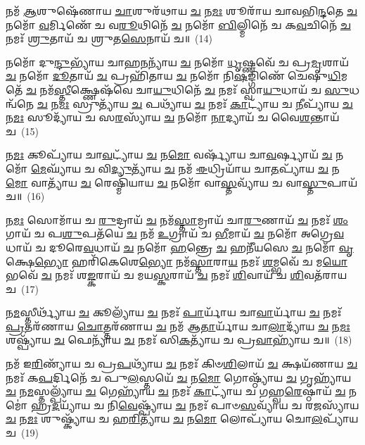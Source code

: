 𑌨𑌮᳴ \ul{𑌆}\-𑌶𑍁𑌷𑍇᳴𑌣𑌾𑌯 \ul{𑌚𑌾}\-𑌶𑍁𑌰᳴𑌥𑌾𑌯 \ul{𑌚} 𑌨\-\ul{𑌮𑌃} 𑌶𑍂𑌰𑌾᳴𑌯 𑌚𑌾𑌵𑌭𑌿\-\ul{𑌨𑍍𑌦}\-𑌤𑍇 \ul{𑌚} 𑌨𑌮𑍋᳴ \ul{𑌵}\-𑌰𑍍𑌮𑌿𑌣𑍇᳴ 𑌚 𑌵\-\ul{𑌰𑍂}\-𑌥𑌿𑌨𑍇᳴ \ul{𑌚} 𑌨𑌮𑍋᳴ \ul{𑌬𑌿}\-𑌲𑍍𑌮𑌿𑌨𑍇᳴ 𑌚 𑌕\-\ul{𑌵}\-𑌚𑌿𑌨𑍇᳴ \ul{𑌚} 𑌨𑌮𑌃᳴ \ul{𑌶𑍍𑌰𑍁}\-𑌤𑌾𑌯᳴ 𑌚 𑌶𑍍𑌰𑍁𑌤\-\ul{𑌸𑍇}\-𑌨𑌾𑌯᳴ 𑌚॥~(14)

{\anuvakamend[{\-\ul{𑌪𑍍𑌰}\-\-\ul{𑌤𑌿}\-\-\ul{𑌶𑍍𑌰}\-𑌵𑌾𑌯᳴ \ul{𑌚} 𑌪𑌞𑍍𑌚᳴𑌵𑌿𑍞𑌶𑌤𑌿𑌶𑍍𑌚}]}%

𑌨𑌮𑍋᳴ 𑌦𑍁\-\ul{𑌨𑍍𑌦𑍁}\-𑌭𑍍𑌯𑌾᳴𑌯 𑌚𑌾𑌹\-\ul{𑌨}\-𑌨𑍍𑌯𑌾᳴𑌯 \ul{𑌚} 𑌨𑌮𑍋᳴ \ul{𑌧𑍃}\-𑌷𑍍𑌣𑌵𑍇᳴ 𑌚 𑌪𑍍𑌰\-\ul{𑌮𑍃}\-𑌶𑌾𑌯᳴ \ul{𑌚} 𑌨𑌮𑍋᳴ \ul{𑌦𑍂}\-𑌤𑌾𑌯᳴ \ul{𑌚} 𑌪𑍍𑌰𑌹𑌿᳴𑌤𑌾𑌯 \ul{𑌚} 𑌨𑌮𑍋᳴ 𑌨𑌿\-\ul{𑌷}\-𑌙𑍍𑌗𑌿𑌣𑍇᳴ 𑌚𑍇𑌷𑍁\-\ul{𑌧𑌿}\-𑌮𑌤𑍇᳴ \ul{𑌚} 𑌨𑌮᳴\-\ul{𑌸𑍍𑌤𑍀}\-𑌕𑍍𑌷𑍍𑌣𑍇𑌷᳴𑌵𑍇 𑌚𑌾\-\ul{𑌯𑍁}\-𑌧𑌿𑌨𑍇᳴ \ul{𑌚} 𑌨𑌮𑌃᳴ 𑌸𑍍𑌵𑌾\-\ul{𑌯𑍁}\-𑌧𑌾𑌯᳴ 𑌚 \ul{𑌸𑍁}\-𑌧𑌨𑍍𑌵᳴𑌨𑍇 \ul{𑌚} 𑌨\-\ul{𑌮𑌃} 𑌸𑍍𑌰𑍁𑌤𑍍𑌯𑌾᳴𑌯 \ul{𑌚} 𑌪𑌥𑍍𑌯𑌾᳴𑌯 \ul{𑌚} 𑌨𑌮𑌃᳴ \ul{𑌕𑌾}\-𑌟𑍍𑌯𑌾᳴𑌯 𑌚 \ul{𑌨𑍀}\-𑌪𑍍𑌯𑌾᳴𑌯 \ul{𑌚} 𑌨\-\ul{𑌮𑌃} 𑌸𑍂𑌦𑍍𑌯𑌾᳴𑌯 𑌚 𑌸\-\ul{𑌰}\-𑌸𑍍𑌯𑌾᳴𑌯 \ul{𑌚} 𑌨𑌮𑍋᳴ \ul{𑌨𑌾}\-𑌦𑍍𑌯𑌾𑌯᳴ 𑌚 𑌵𑍈\-\ul{𑌶}\-𑌨𑍍𑌤𑌾𑌯᳴ 𑌚~(15)

𑌨\-\ul{𑌮𑌃} 𑌕𑍂𑌪𑍍𑌯𑌾᳴𑌯 𑌚𑌾\-\ul{𑌵}\-𑌟𑍍𑌯𑌾᳴𑌯 \ul{𑌚} 𑌨\-\ul{𑌮𑍋} 𑌵𑌰𑍍𑌷𑍍𑌯𑌾᳴𑌯 𑌚𑌾\-\ul{𑌵}\-𑌰𑍍𑌷𑍍𑌯𑌾𑌯᳴ \ul{𑌚} 𑌨𑌮𑍋᳴ \ul{𑌮𑍇}\-𑌘𑍍𑌯𑌾᳴𑌯 𑌚 𑌵𑌿\-\ul{𑌦𑍍𑌯𑍁}\-𑌤𑍍𑌯𑌾᳴𑌯 \ul{𑌚} 𑌨𑌮᳴ \ul{𑌈}\-𑌧𑍍𑌰𑌿𑌯𑌾᳴𑌯 𑌚𑌾\-\ul{𑌤}\-𑌪𑍍𑌯𑌾᳴𑌯 \ul{𑌚} 𑌨\-\ul{𑌮𑍋} 𑌵𑌾𑌤𑍍𑌯𑌾᳴𑌯 \ul{𑌚} 𑌰𑍇𑌷𑍍𑌮𑌿᳴𑌯𑌾𑌯 \ul{𑌚} 𑌨𑌮𑍋᳴ 𑌵𑌾\-\ul{𑌸𑍍𑌤}\-𑌵𑍍𑌯𑌾᳴𑌯 𑌚 𑌵𑌾\-\ul{𑌸𑍍𑌤𑍁}\-𑌪𑌾𑌯᳴ 𑌚॥~(16)

{\anuvakamend[{\-\ul{𑌵𑍈}\-\-\ul{𑌶}\-𑌨𑍍𑌤𑌾𑌯᳴ 𑌚 \ul{𑌤𑍍𑌰𑌿}\-\-\ul{𑍞}\-𑌶𑌚𑍍𑌚᳴}]}%

𑌨\-\ul{𑌮𑌃} 𑌸𑍋𑌮𑌾᳴𑌯 𑌚 \ul{𑌰𑍁}\-𑌦𑍍𑌰𑌾𑌯᳴ \ul{𑌚} 𑌨𑌮᳴\-\ul{𑌸𑍍𑌤𑌾}\-𑌮𑍍𑌰𑌾𑌯᳴ 𑌚𑌾\-\ul{𑌰𑍁}\-𑌣𑌾𑌯᳴ \ul{𑌚} 𑌨𑌮𑌃᳴ \ul{𑌶𑌂}\-𑌗𑌾𑌯᳴ 𑌚 𑌪\-\ul{𑌶𑍁}\-𑌪𑌤᳴𑌯𑍇 \ul{𑌚} 𑌨𑌮᳴ \ul{𑌉}\-𑌗𑍍𑌰𑌾𑌯᳴ 𑌚 \ul{𑌭𑍀}\-𑌮𑌾𑌯᳴ \ul{𑌚} 𑌨𑌮𑍋᳴ 𑌅𑌗𑍍𑌰𑍇\-\ul{𑌵}\-𑌧𑌾𑌯᳴ 𑌚 𑌦𑍂𑌰𑍇\-\ul{𑌵}\-𑌧𑌾𑌯᳴ \ul{𑌚} 𑌨𑌮𑍋᳴ \ul{𑌹}\-𑌨𑍍𑌤𑍍𑌰𑍇 \ul{𑌚} 𑌹𑌨𑍀᳴𑌯𑌸𑍇 \ul{𑌚} 𑌨𑌮𑍋᳴ \ul{𑌵𑍃}\-𑌕𑍍𑌷𑍇\-\ul{𑌭𑍍𑌯𑍋} 𑌹𑌰𑌿᳴𑌕𑍇𑌶𑍇\-\ul{𑌭𑍍𑌯𑍋} 𑌨𑌮᳴\-\ul{𑌸𑍍𑌤𑌾}\-𑌰𑌾\-\ul{𑌯} 𑌨𑌮𑌃᳴ \ul{𑌶}\-𑌮𑍍𑌭𑌵𑍇᳴ 𑌚 𑌮\-\ul{𑌯𑍋}\-𑌭𑌵𑍇᳴ \ul{𑌚} 𑌨𑌮𑌃᳴ 𑌶\-\ul{𑌙𑍍𑌕}\-𑌰𑌾𑌯᳴ 𑌚 𑌮𑌯\-\ul{𑌸𑍍𑌕}\-𑌰𑌾𑌯᳴ \ul{𑌚} 𑌨𑌮𑌃᳴ \ul{𑌶𑌿}\-𑌵𑌾𑌯᳴ 𑌚 \ul{𑌶𑌿}\-𑌵𑌤᳴𑌰𑌾𑌯 𑌚~(17)

𑌨\-\ul{𑌮}\-𑌸𑍍𑌤𑍀𑌰𑍍𑌥𑍍𑌯𑌾᳴𑌯 \ul{𑌚} 𑌕𑍂𑌲𑍍𑌯𑌾᳴𑌯 \ul{𑌚} 𑌨𑌮𑌃᳴ \ul{𑌪𑌾}\-𑌰𑍍𑌯𑌾᳴𑌯 𑌚𑌾\-\ul{𑌵𑌾}\-𑌰𑍍𑌯𑌾᳴𑌯 \ul{𑌚} 𑌨𑌮𑌃᳴ \ul{𑌪𑍍𑌰}\-𑌤𑌰᳴𑌣𑌾𑌯 \ul{𑌚𑍋}\-𑌤𑍍𑌤𑌰᳴𑌣𑌾𑌯 \ul{𑌚} 𑌨𑌮᳴ 𑌆\-\ul{𑌤𑌾}\-𑌰𑍍𑌯𑌾᳴𑌯 𑌚𑌾\-\ul{𑌲𑌾}\-𑌦𑍍𑌯𑌾᳴𑌯 \ul{𑌚} 𑌨\-\ul{𑌮𑌃} 𑌶𑌷𑍍𑌪𑍍𑌯𑌾᳴𑌯 \ul{𑌚} 𑌫𑍇𑌨𑍍𑌯𑌾᳴𑌯 \ul{𑌚} 𑌨𑌮𑌃᳴ 𑌸𑌿\-\ul{𑌕}\-𑌤𑍍𑌯𑌾᳴𑌯 𑌚 𑌪𑍍𑌰\-\ul{𑌵𑌾}\-𑌹𑍍𑌯𑌾᳴𑌯 𑌚॥~(18)

{\anuvakamend[{\-\ul{𑌶𑌿}\-𑌵𑌤᳴𑌰𑌾𑌯 𑌚 \ul{𑌤𑍍𑌰𑌿}\-\-\ul{𑍞}\-𑌶𑌚𑍍𑌚᳴}]}%

𑌨𑌮᳴ 𑌇\-\ul{𑌰𑌿}\-𑌣𑍍𑌯𑌾᳴𑌯 𑌚 𑌪𑍍𑌰\-\ul{𑌪}\-𑌥𑍍𑌯𑌾᳴𑌯 \ul{𑌚} 𑌨𑌮𑌃᳴ 𑌕𑌿𑍞\-\ul{𑌶𑌿}\-𑌲𑌾𑌯᳴ \ul{𑌚} 𑌕𑍍𑌷𑌯᳴𑌣𑌾𑌯 \ul{𑌚} 𑌨𑌮𑌃᳴ 𑌕\-\ul{𑌪}\-𑌰𑍍𑌦𑌿𑌨𑍇᳴ 𑌚 𑌪𑍁\-\ul{𑌲}\-𑌸𑍍𑌤𑌯𑍇᳴ \ul{𑌚} 𑌨\-\ul{𑌮𑍋} 𑌗𑍋𑌷𑍍𑌠𑍍𑌯𑌾᳴𑌯 \ul{𑌚} 𑌗𑍃𑌹𑍍𑌯𑌾᳴𑌯 \ul{𑌚} 𑌨\-\ul{𑌮}\-𑌸𑍍𑌤𑌲𑍍𑌪𑍍𑌯𑌾᳴𑌯 \ul{𑌚} 𑌗𑍇𑌹𑍍𑌯𑌾᳴𑌯 \ul{𑌚} 𑌨𑌮𑌃᳴ \ul{𑌕𑌾}\-𑌟𑍍𑌯𑌾᳴𑌯 𑌚 𑌗𑌹𑍍𑌵\-\ul{𑌰𑍇}\-𑌷𑍍𑌠𑌾𑌯᳴ \ul{𑌚} 𑌨𑌮𑍋॑ 𑌹𑍍𑌰\-\ul{𑌦}\-𑌯𑍍𑌯𑌾᳴𑌯 𑌚 𑌨𑌿\-\ul{𑌵𑍇}\-𑌷𑍍𑌪𑍍𑌯𑌾᳴𑌯 \ul{𑌚} 𑌨𑌮𑌃᳴ 𑌪𑌾𑍞\-\ul{𑌸}\-𑌵𑍍𑌯𑌾᳴𑌯 𑌚 𑌰\-\ul{𑌜}\-𑌸𑍍𑌯𑌾᳴𑌯 \ul{𑌚} 𑌨\-\ul{𑌮𑌃} 𑌶𑍁𑌷𑍍𑌕𑍍𑌯𑌾᳴𑌯 𑌚 𑌹\-\ul{𑌰𑌿}\-𑌤𑍍𑌯𑌾᳴𑌯 \ul{𑌚} 𑌨\-\ul{𑌮𑍋} 𑌲𑍋𑌪𑍍𑌯𑌾᳴𑌯 𑌚𑍋\-\ul{𑌲}\-𑌪𑍍𑌯𑌾᳴𑌯 𑌚~(19)

